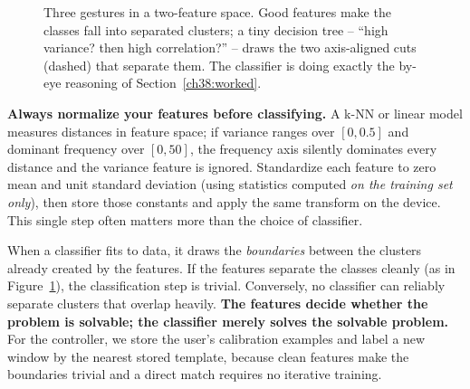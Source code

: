 \begin{figure}[H]
\centering
{}
\caption{Three gestures in a two-feature space. Good features make the classes
fall into separated clusters; a tiny decision tree -- ``high variance? then high
correlation?'' -- draws the two axis-aligned cuts (dashed) that separate them. The
classifier is doing exactly the by-eye reasoning of Section~\ref{ch38:worked}.}
\label{ch38:fig-decision}
\end{figure}

\begin{focusbox}
\textbf{Always normalize your features before classifying.} A k-NN or linear model
measures distances in feature space; if variance ranges over $[0, 0.5]$ and
dominant frequency over $[0, 50]$, the frequency axis silently dominates every
distance and the variance feature is ignored. Standardize each feature to zero
mean and unit standard deviation (using statistics computed \emph{on the training
set only}), then store those constants and apply the same transform on the device.
This single step often matters more than the choice of classifier.
\end{focusbox}

\begin{happeningbox}
When a classifier fits to data, it draws the \emph{boundaries} between the clusters already created by the features. If the features separate the classes cleanly (as in Figure~\ref{ch38:fig-decision}), the classification step is trivial. Conversely, no classifier can reliably separate clusters that overlap heavily. \textbf{The features decide whether the problem is solvable; the classifier merely solves the solvable problem.} For the controller, we store the user's calibration examples and label a new window by the nearest stored template, because clean features make the boundaries trivial and a direct match requires no iterative training.
\end{happeningbox}

